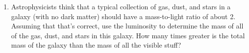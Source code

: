 \begin{enumerate}
\vskip 0.5in

\item Astrophysicists think that a typical collection of gas,
dust, and stars in a galaxy (with no dark matter) 
should have a mass-to-light ratio of about 2.  Assuming that
that's correct, use the luminosity to 
determine the mass of all of the gas, dust, and
stars in this galaxy.  How many times greater is the total mass
of the galaxy than the mass of all the visible stuff?

\end{enumerate}


